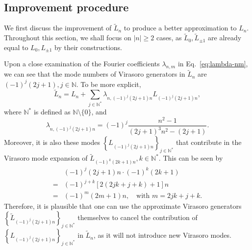 \documentclass[12pt, nofootinbib]{article}
\theoremstyle{plain}
\theoremstyle{assumption}
\theoremstyle{definition}
\theoremstyle{plain}
\theoremstyle{plain}
\theoremstyle{plain}
\theoremstyle{plain}
\theoremstyle{plain}
\def\Leff{\widetilde{L}}
\begin{document}
\subsection{Improvement procedure}
We first discuss the improvement of $\Leff_n$ to produce a better approximation to $L_n$. Throughout this section, we shall focus on $|n|\geq 2$ cases, as $\Leff_{0},\Leff_{\pm 1}$ are already equal to $L_0,L_{\pm 1}$ by their constructions. 

Upon a close examination of the Fourier coefficients $\lambda_{n,m}$ in Eq.~\eqref{eq:lambda-nm}, we can see that the mode numbers of Virasoro generators in $\Leff_n$ are $(-1)^j(2j+1),j\in\mathbb{N}$. To be more explicit, 
\begin{equation}\label{eq:Leffn-expand-2}
    \Leff_n = L_n + \sum_{j\in\mathbb{N}^*}\lambda_{n,(-1)^j(2j+1)n}L_{(-1)^j(2j+1)n},
\end{equation}
where $\mathbb{N}^*$ is defined as $\mathbb{N}\setminus\{0\}$, and 
\begin{equation}
    \lambda_{n,(-1)^j(2j+1)n} = (-1)^j \frac{n^2-1}{(2j+1)^3n^2 - (2j+1)}.
\end{equation}
Moreover, it is also these modes $\left\{ L_{(-1)^j(2j+1)n}\right\}_{j\in\mathbb{N}^*}$ that contribute in the Virasoro mode expansion of $\Leff_{(-1)^{k}(2k+1)n},k\in\mathbb{N}^*$. This can be seen by 
\begin{equation}\begin{split}
    &(-1)^{j}(2j+1)n\cdot (-1)^{k}(2k+1) \\ 
    = &(-1)^{j+k}[2(2jk+j+k)+1 ]n \\ 
    = &(-1)^{m}(2m+1)n,\quad \text{with }m=2jk+j+k. 
\end{split}
\end{equation}
Therefore, it is plausible that one can use the approximate Virasoro generators $\left\{ \Leff_{(-1)^j(2j+1)n}\right\}_{j\in\mathbb{N}^*}$ themselves to cancel the contribution of $\left\{ L_{(-1)^j(2j+1)n}\right\}_{j\in\mathbb{N}^*}$ in $\Leff_n$, as it will not introduce new Virasoro modes. 
\end{document}
